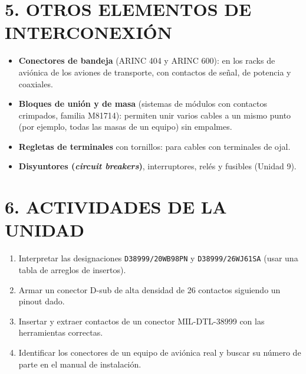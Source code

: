 \section*{5. OTROS ELEMENTOS DE INTERCONEXIÓN}
\begin{itemize}
  \item \textbf{Conectores de bandeja} (ARINC 404 y ARINC 600): en los racks de aviónica de los aviones
        de transporte, con contactos de señal, de potencia y coaxiales.
  \item \textbf{Bloques de unión y de masa} (sistemas de módulos con contactos crimpados, familia
        M81714): permiten unir varios cables a un mismo punto (por ejemplo, todas las masas de un
        equipo) sin empalmes.
  \item \textbf{Regletas de terminales} con tornillos: para cables con terminales de ojal.
  \item \textbf{Disyuntores (\textit{circuit breakers})}, interruptores, relés y fusibles (Unidad 9).
\end{itemize}

\section*{6. ACTIVIDADES DE LA UNIDAD}
\begin{enumerate}
  \item Interpretar las designaciones \texttt{D38999/20WB98PN} y \texttt{D38999/26WJ61SA}
        (usar una tabla de arreglos de insertos).
  \item Armar un conector D-sub de alta densidad de 26 contactos siguiendo un pinout dado.
  \item Insertar y extraer contactos de un conector MIL-DTL-38999 con las herramientas correctas.
  \item Identificar los conectores de un equipo de aviónica real y buscar su número de parte en el
        manual de instalación.
\end{enumerate}
